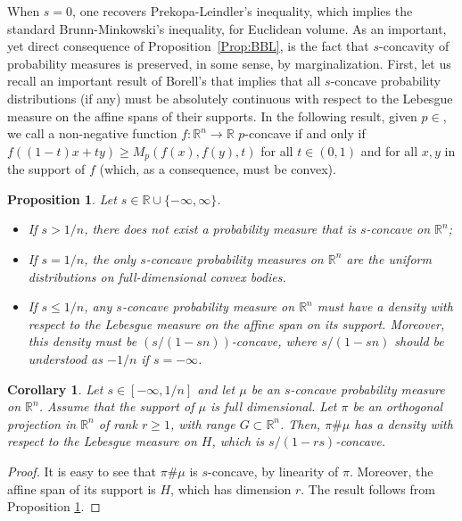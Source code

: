 \documentclass[sts]{imsart}
\newtheorem{proposition}[theorem]{Proposition}
\newtheorem{corollary}[theorem]{Corollary}
\theoremstyle{definition}
\theoremstyle{remark}
\newcommand{\R}{\mathbb{R}}
\begin{document}
When $s=0$, one recovers Prekopa-Leindler's inequality, which implies the standard Brunn-Minkowski's inequality, for Euclidean volume. As an important, yet direct consequence of Proposition~\ref{Prop:BBL}, is the fact that $s$-concavity of probability measures is preserved, in some sense, by marginalization. First, let us recall an important result of Borell's that implies that all $s$-concave probability distributions (if any) must be absolutely continuous with respect to the Lebesgue measure on the affine spans of their supports. In the following result, given $p\in $, we call a non-negative function $f:\R^n\to\R$ $p$-concave if and only if $f((1-t)x+ty)\geq M_p(f(x),f(y),t)$ for all $t\in (0,1)$ and for all $x,y$ in the support of $f$ (which, as a consequence, must be convex). 

\begin{proposition}\cite[Theorem 3.2]{Borell} \label{Prop:Borell}
Let $s\in \R\cup \{-\infty,\infty\}$. 
\begin{itemize}
    \item If $s>1/n$, there does not exist a probability measure that is $s$-concave on $\R^n$;
    \item If $s=1/n$, the only $s$-concave probability measures on $\R^n$ are the uniform distributions on full-dimensional convex bodies.
    \item If $s\leq 1/n$, any $s$-concave probability measure on $\R^n$ must have a density with respect to the Lebesgue measure on the affine span on its support. Moreover, this density must be $(s/(1-sn))$-concave, where $s/(1-sn)$ should be understood as $-1/n$ if $s=-\infty$.
\end{itemize}
\end{proposition}

\begin{corollary}
    Let $s\in [-\infty,1/n]$ and let $\mu$ be an $s$-concave probability measure on $\R^n$. Assume that the support of $\mu$ is full dimensional. Let $\pi$ be an orthogonal projection in $\R^n$ of rank $r\geq 1$, with range $G\subset \R^n$. Then, $\pi\#\mu$ has a density with respect to the Lebesgue measure on $H$, which is $s/(1-rs)$-concave. 
\end{corollary}

\begin{proof}
    It is easy to see that $\pi\#\mu$ is $s$-concave, by linearity of $\pi$. Moreover, the affine span of its support is $H$, which has dimension $r$. The result follows from Proposition \ref{Prop:Borell}.
\end{proof}
\end{document}
